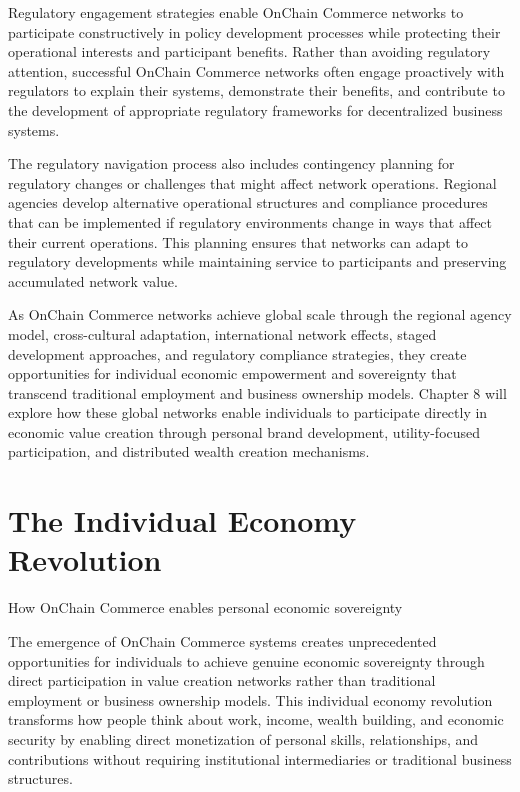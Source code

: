 \documentclass[
  Letterpaper,
]{scrbook}
\begin{document}
Regulatory engagement strategies enable OnChain Commerce networks to
participate constructively in policy development processes while
protecting their operational interests and participant benefits. Rather
than avoiding regulatory attention, successful OnChain Commerce networks
often engage proactively with regulators to explain their systems,
demonstrate their benefits, and contribute to the development of
appropriate regulatory frameworks for decentralized business systems.

The regulatory navigation process also includes contingency planning for
regulatory changes or challenges that might affect network operations.
Regional agencies develop alternative operational structures and
compliance procedures that can be implemented if regulatory environments
change in ways that affect their current operations. This planning
ensures that networks can adapt to regulatory developments while
maintaining service to participants and preserving accumulated network
value.

As OnChain Commerce networks achieve global scale through the regional
agency model, cross-cultural adaptation, international network effects,
staged development approaches, and regulatory compliance strategies,
they create opportunities for individual economic empowerment and
sovereignty that transcend traditional employment and business ownership
models. Chapter 8 will explore how these global networks enable
individuals to participate directly in economic value creation through
personal brand development, utility-focused participation, and
distributed wealth creation mechanisms.

\chapter{The Individual Economy
Revolution}\label{sec-individual-economy}

How OnChain Commerce enables personal economic sovereignty

The emergence of OnChain Commerce systems creates unprecedented
opportunities for individuals to achieve genuine economic sovereignty
through direct participation in value creation networks rather than
traditional employment or business ownership models. This individual
economy revolution transforms how people think about work, income,
wealth building, and economic security by enabling direct monetization
of personal skills, relationships, and contributions without requiring
institutional intermediaries or traditional business structures.
\end{document}
